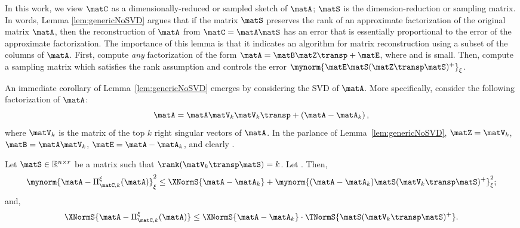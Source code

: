 In this work, we view $\matC$ as a dimensionally-reduced or sampled sketch of $\matA$; $\matS$ is the dimension-reduction or sampling matrix.
In words, Lemma \ref{lem:genericNoSVD} argues that if the matrix $\matS$ preserves the rank of an approximate factorization of the original matrix $\matA$, then
the reconstruction of $\matA$ from $\matC = \matA \matS$ has an error that is essentially proportional to the error of the approximate factorization.
The importance of this lemma is that it  indicates an algorithm for matrix reconstruction using a subset of the columns of $\matA$. First,
compute \emph{any} factorization of the form
$\matA = \matB \matZ\transp + \matE$, where \math{\matB=\matA\matZ} and
\math{\mynorm{\matE}_\xi} is small.
Then, compute a sampling matrix \math{\matS}
which satisfies the rank assumption and controls
the error $\mynorm{\matE \matS (\matZ\transp\matS)^+}_\xi$.

An immediate corollary of Lemma~\ref{lem:genericNoSVD} emerges by considering the SVD of $\matA$. More specifically, consider the following factorization of $\matA$:
$$\matA = \matA\matV_k\matV_k\transp + \left(\matA-\matA_k\right),$$
where $\matV_k$ is the matrix of the top $k$ right singular vectors of $\matA$. In the parlance of Lemma~\ref{lem:genericNoSVD}, $\matZ = \matV_k$, $\matB = \matA \matV_k$, $\matE = \matA -\matA_k$, and clearly .
\begin{lemma}
\label{lem:generic}
Let $\matS \in \mathbb{R}^{n \times r}$ be a matrix such that
$\rank(\matV_k\transp\matS) = k$. Let \math{\matC=\matA\matS}. Then,
\begin{equation}\label{eqn3}
\mynorm{\matA - \Pi_{\matC,k}^{\xi}(\matA)}_\xi^2
\leq \XNormS{\matA-\matA_k} + \mynorm{(\matA-\matA_k) \matS (\matV_k\transp \matS)^+}_\xi^2;
\end{equation}
and,
\begin{equation}\label{eqn4}
\XNormS{\matA - \Pi^{\xi}_{\matC,k}(\matA)}
\leq \XNormS{\matA-\matA_k} \cdot \TNormS{ \matS (\matV_k\transp \matS)^+}.
\end{equation}
\end{lemma}


